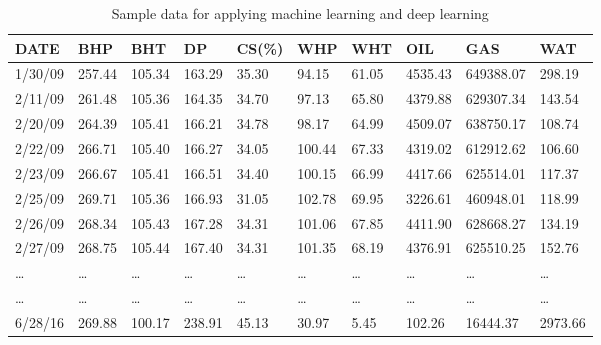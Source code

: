 \documentclass[12pt,a4paper]{report}
\begin{document}
\begin{table}[H]
\caption{Sample data for applying machine learning and deep learning}
\centering
\begin{adjustbox}{width=1\textwidth}
\small
\begin{tabular}{@{}llllllllll@{}}
\toprule
\textbf{DATE} & \textbf{BHP} & \textbf{BHT} & \textbf{DP} & \textbf{CS(\%)} & \textbf{WHP} & \textbf{WHT} & \textbf{OIL} & \textbf{GAS} & \textbf{WAT} \\ \midrule
1/30/09       & 257.44       & 105.34       & 163.29      & 35.30           & 94.15        & 61.05        & 4535.43      & 649388.07    & 298.19       \\
2/11/09       & 261.48       & 105.36       & 164.35      & 34.70           & 97.13        & 65.80        & 4379.88      & 629307.34    & 143.54       \\
2/20/09       & 264.39       & 105.41       & 166.21      & 34.78           & 98.17        & 64.99        & 4509.07      & 638750.17    & 108.74       \\
2/22/09       & 266.71       & 105.40       & 166.27      & 34.05           & 100.44       & 67.33        & 4319.02      & 612912.62    & 106.60       \\
2/23/09       & 266.67       & 105.41       & 166.51      & 34.40           & 100.15       & 66.99        & 4417.66      & 625514.01    & 117.37       \\
2/25/09       & 269.71       & 105.36       & 166.93      & 31.05           & 102.78       & 69.95        & 3226.61      & 460948.01    & 118.99       \\
2/26/09       & 268.34       & 105.43       & 167.28      & 34.31           & 101.06       & 67.85        & 4411.90      & 628668.27    & 134.19       \\
2/27/09       & 268.75       & 105.44       & 167.40      & 34.31           & 101.35       & 68.19        & 4376.91      & 625510.25    & 152.76       \\
…             & …            & …            & …           & …               & …            & …            & …            & …            & …            \\
…             & …            & …            & …           & …               & …            & …            & …            & …            & …            \\
6/28/16       & 269.88       & 100.17       & 238.91      & 45.13           & 30.97        & 5.45         & 102.26       & 16444.37     & 2973.66      \\

\end{tabular}
\end{adjustbox}
\end{table}
\end{document}
